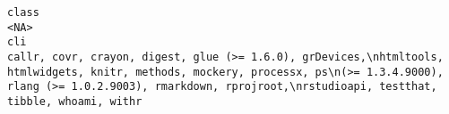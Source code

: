 \documentclass[
  letterpaper,
  DIV=11,
  numbers=noendperiod]{scrreprt}
\begin{document}
\begin{verbatim}
class                                                                                                                                                                                                                                                                                                                                                                                                                                                                                                                                                                                                                                                                                                                                                                                                                                                                                                                                                                                                                                                                                                                                                                                                                                                                                                    <NA>
cli                                                                                                                                                                                                                                                                                                                                                                                                                                                                                                                                                                                                                                                                                                                                                                                                                                                                                                                                                                                                                                                                       callr, covr, crayon, digest, glue (>= 1.6.0), grDevices,\nhtmltools, htmlwidgets, knitr, methods, mockery, processx, ps\n(>= 1.3.4.9000), rlang (>= 1.0.2.9003), rmarkdown, rprojroot,\nrstudioapi, testthat, tibble, whoami, withr

\end{verbatim}
\end{document}
